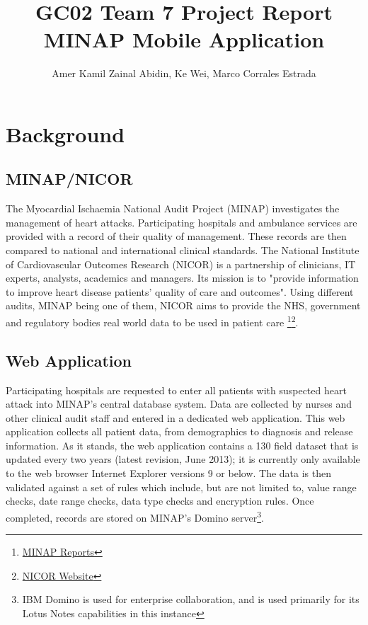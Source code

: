 \documentclass[12pt,a4paper,oneside,titlepage]{article}
\begin{document}
\title{GC02 Team 7 Project Report \\ MINAP Mobile Application}
\author{Amer Kamil Zainal Abidin, Ke Wei, Marco Corrales Estrada}
\maketitle

\tableofcontents
\newpage
\section{Background}
\subsection{MINAP/NICOR}
The Myocardial Ischaemia National Audit Project (MINAP) investigates the management of heart attacks. Participating hospitals and ambulance services are provided with a record of their quality of management. These records are then compared to national and international clinical standards. The National Institute of Cardiovascular Outcomes Research (NICOR) is a partnership of clinicians, IT experts, analysts, academics and managers. Its mission is to "provide information to improve heart disease patients' quality of care and outcomes". Using different audits, MINAP being one of them, NICOR aims to provide the NHS, government and regulatory bodies real world data to be used in patient care \footnote{\href{http://www.ucl.ac.uk/nicor/audits/minap/publicreports}{MINAP Reports}}\footnote{\href{http://www.ucl.ac.uk/nicor}{NICOR Website}}. 

\subsection{Web Application}
Participating hospitals are requested to enter all patients with suspected heart attack into MINAP's central database system. Data are collected by nurses and other clinical audit staff and entered in a dedicated web application. This web application collects all patient data, from demographics to diagnosis and release information. As it stands, the web application contains a 130 field dataset that is updated every two years (latest revision, June 2013); it is currently only available to the web browser Internet Explorer versions 9 or below. The data is then validated against a set of rules which include, but are not limited to, value range checks, date range checks, data type checks and encryption rules. Once completed, records are stored on MINAP's Domino server\footnote{IBM Domino is used for enterprise collaboration, and is used primarily for its Lotus Notes capabilities in this instance}.
\end{document}
